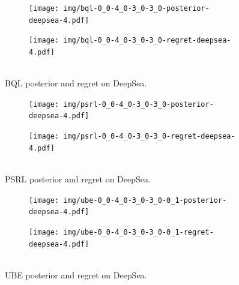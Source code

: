 \documentclass{article}
\begin{document}
\begin{appendices}
\begin{figure}[h!]
\centering
\begin{subfigure}{0.65\textwidth}
\texttt{[image: img/bql-0\_0-4\_0-3\_0-3\_0-posterior-deepsea-4.pdf]}
\end{subfigure}
\begin{subfigure}{0.34\textwidth}
\texttt{[image: img/bql-0\_0-4\_0-3\_0-3\_0-regret-deepsea-4.pdf]}~\\~\\
\end{subfigure}
\captionsetup{width=0.9\linewidth}
\caption{BQL posterior and regret on DeepSea.}\label{bql_deepsea_visual}
\end{figure}

\begin{figure}[h!]
\centering
\begin{subfigure}{0.65\textwidth}
\texttt{[image: img/psrl-0\_0-4\_0-3\_0-3\_0-posterior-deepsea-4.pdf]}
\end{subfigure}
\begin{subfigure}{0.34\textwidth}
\texttt{[image: img/psrl-0\_0-4\_0-3\_0-3\_0-regret-deepsea-4.pdf]}~\\~\\
\end{subfigure}
\captionsetup{width=0.9\linewidth}
\caption{PSRL posterior and regret on DeepSea.}\label{psrl_deepsea_visual}
\end{figure}

\begin{figure}[h!]
\centering
\vspace{-1cm}
\begin{subfigure}{0.65\textwidth}
\texttt{[image: img/ube-0\_0-4\_0-3\_0-3\_0-0\_1-posterior-deepsea-4.pdf]}
\end{subfigure}
\begin{subfigure}{0.34\textwidth}
\texttt{[image: img/ube-0\_0-4\_0-3\_0-3\_0-0\_1-regret-deepsea-4.pdf]}~\\~\\
\end{subfigure}
\captionsetup{width=0.9\linewidth}
\caption{UBE posterior and regret on DeepSea.}\label{ube_deepsea_visual01}
\end{figure}


\end{appendices}
\end{document}
